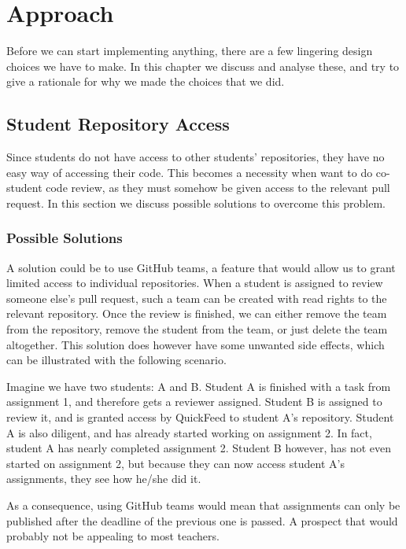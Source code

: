 
\chapter{Approach}
\label{ch:approach}

Before we can start implementing anything, there are a few lingering design choices we have to make.
In this chapter we discuss and analyse these, and try to give a rationale for why we made the choices that we did.

\section{Student Repository Access}

Since students do not have access to other students' repositories, they have no easy way of accessing their code.
This becomes a necessity when want to do co-student code review, as they must somehow be given access to the relevant pull request.
In this section we discuss possible solutions to overcome this problem.

\subsection{Possible Solutions}

A solution could be to use GitHub teams, a feature that would allow us to grant limited access to individual repositories.
When a student is assigned to review someone else's pull request, such a team can be created with read rights to the relevant repository.
Once the review is finished, we can either remove the team from the repository, remove the student from the team, or just delete the team altogether.
This solution does however have some unwanted side effects, which can be illustrated with the following scenario.

Imagine we have two students: A and B.
Student A is finished with a task from assignment 1, and therefore gets a reviewer assigned.
Student B is assigned to review it, and is granted access by QuickFeed to student A's repository.
Student A is also diligent, and has already started working on assignment 2.
In fact, student A has nearly completed assignment 2.
Student B however, has not even started on assignment 2, but because they can now access student A's assignments, they see how he/she did it.

As a consequence, using GitHub teams would mean that assignments can only be published after the deadline of the previous one is passed.
A prospect that would probably not be appealing to most teachers.

